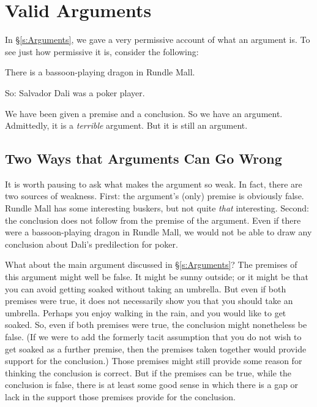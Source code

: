 \chapter{Valid Arguments}\label{s:Valid}
In §\ref{s:Arguments}, we gave a very permissive account of what an argument is. To see just how permissive it is, consider the following:
	\begin{earg}
		\item[] There is a bassoon-playing dragon in Rundle Mall.
		\item[So:] Salvador Dali was a poker player.
	\end{earg}
We have been given a premise and a conclusion. So we have an argument. Admittedly, it is a \emph{terrible} argument. But it is still an argument.

\section{Two Ways that Arguments Can Go Wrong}\label{s:twoways}

It is worth pausing to ask what makes the argument so weak. In fact, there are two sources of weakness. First: the argument's (only) premise is obviously false. Rundle Mall has some interesting buskers, but not quite \emph{that} interesting. Second: the conclusion does not follow from the premise of the argument. Even if there were a bassoon-playing dragon in Rundle Mall, we would not be able to draw any conclusion about Dali's predilection for poker.

What about the main argument discussed in §\ref{s:Arguments}? The premises of this argument might well be false. It might be sunny outside; or it might be that you can avoid getting soaked without taking an umbrella. But even if both premises were true, it does not necessarily show you that you should take an umbrella. Perhaps you enjoy walking in the rain, and you would like to get soaked. So, even if both premises were true, the conclusion might nonetheless be false. (If we were to add the formerly tacit assumption that you do not wish to get soaked as a further premise, then the premises taken together would provide support for the conclusion.) Those premises might still provide some reason for thinking the conclusion is correct. But if the premises can be true, while the conclusion is false, there is at least some good sense in which there is a gap or lack in the support those premises provide for the conclusion.

